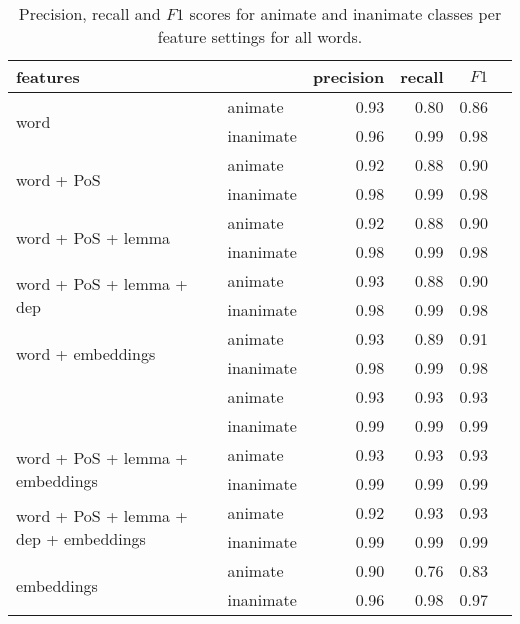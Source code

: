 \documentclass[a4paper,UKenglish]{oasics}
\begin{document}
\begin{table*}
\centering
\begin{tabular}{llrrrr}
\toprule
features                                                 &           & precision & recall & $F1$ \\ \midrule
\multirow{2}{*}{word}                                    & animate   & 0.93      & 0.80   & 0.86 \\
                                                         & inanimate & 0.96      & 0.99   & 0.98 \\
\multirow{2}{*}{word + PoS}                              & animate   & 0.92      & 0.88   & 0.90 \\
                                                         & inanimate & 0.98      & 0.99   & 0.98 \\
\multirow{2}{*}{word + PoS + lemma}                      & animate   & 0.92      & 0.88   & 0.90 \\
                                                         & inanimate & 0.98      & 0.99   & 0.98 \\
\multirow{2}{*}{word + PoS + lemma + dep}                & animate   & 0.93      & 0.88   & 0.90 \\
                                                         & inanimate & 0.98      & 0.99   & 0.98 \\
\multirow{2}{*}{word + embeddings}                       & animate   & 0.93      & 0.89   & 0.91 \\
                                                         & inanimate & 0.98      & 0.99   & 0.98 \\
\rowcolor{Gray}                                          & animate   & 0.93      & 0.93   & 0.93 \\
\rowcolor{Gray}\multirow{-2}{*}{word + PoS + embeddings} & inanimate & 0.99      & 0.99   & 0.99 \\
\multirow{2}{*}{word + PoS + lemma + embeddings}         & animate   & 0.93      & 0.93   & 0.93 \\
                                                         & inanimate & 0.99      & 0.99   & 0.99 \\
\multirow{2}{*}{word + PoS + lemma + dep + embeddings}   & animate   & 0.92      & 0.93   & 0.93 \\
                                                         & inanimate & 0.99      & 0.99   & 0.99 \\
\multirow{2}{*}{embeddings}                              & animate   & 0.90      & 0.76   & 0.83 \\
                                                         & inanimate & 0.96      & 0.98   & 0.97 \\

\bottomrule
\end{tabular}
\caption{Precision, recall and $F1$ scores for animate and inanimate classes per feature settings for all words.}
\label{tab:results-all}
\end{table*}
\end{document}
